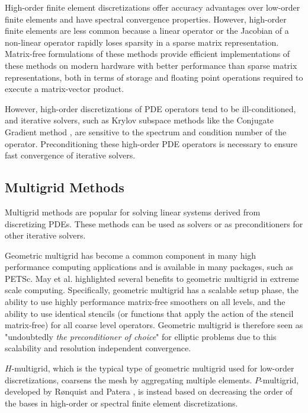 High-order finite element discretizations offer accuracy advantages over low-order finite elements \cite{demkowicz1989toward, oden1989toward, rachowicz1989toward} and have spectral convergence properties.
However, high-order finite elements are less common because a linear operator or the Jacobian of a non-linear operator rapidly loses sparsity in a sparse matrix representation.
Matrix-free formulations of these methods \cite{brown2010efficient, deville2002highorder, knoll2004jacobian} provide efficient implementations of these methods on modern hardware \cite{libceed-user-manual, fischer2020scalability, kronbichler2019multigrid} with better performance than sparse matrix representations, both in terms of storage and floating point operations required to execute a matrix-vector product.

However, high-order discretizations of PDE operators tend to be ill-conditioned, and iterative solvers, such as Krylov subspace methods like the Conjugate Gradient method \cite{hestenes1952methods, shewchuk1994introduction}, are sensitive to the spectrum and condition number of the operator.
Preconditioning these high-order PDE operators is necessary to ensure fast convergence of iterative solvers.

\subsection{Multigrid Methods}

Multigrid methods \cite{brandt1982guide, briggs2000multigrid, stuben1982multigrid} are popular for solving linear systems derived from discretizing PDEs.
These methods can be used as solvers or as preconditioners for other iterative solvers.

Geometric multigrid has become a common component in many high performance computing applications and is available in many packages, such as PETSc.
May et al. \cite{may2016extreme} highlighted several benefits to geometric multigrid in extreme scale computing.
Specifically, geometric multigrid has a scalable setup phase, the ability to use highly performance matrix-free smoothers on all levels, and the ability to use identical stencils (or functions that apply the action of the stencil matrix-free) for all coarse level operators.
Geometric multigrid is therefore seen as "undoubtedly {\textit{the preconditioner of choice}}" for elliptic problems due to this scalability and resolution independent convergence.

$H$-multigrid, which is the typical type of geometric multigrid used for low-order discretizations, coarsens the mesh by aggregating multiple elements.
$P$-multigrid, developed by R{\o}nquist and Patera \cite{ronquist1987spectral}, is instead based on decreasing the order of the bases in high-order or spectral finite element discretizations.

